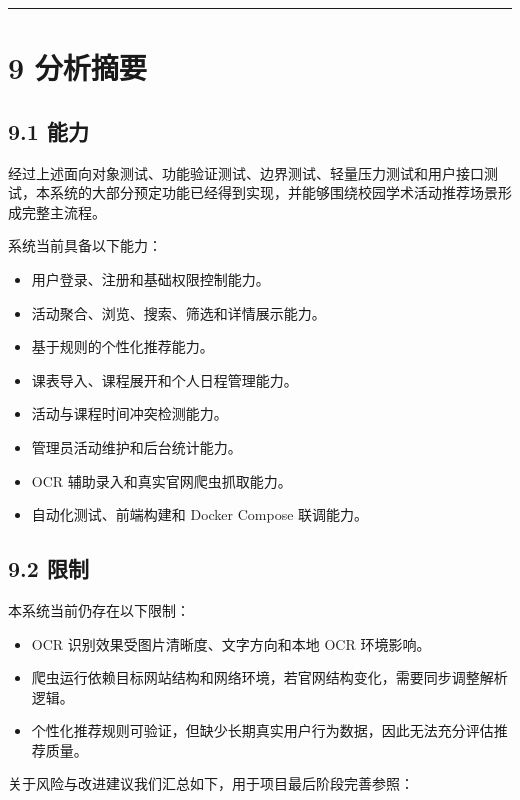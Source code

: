 \begin{center}\rule{0.5\linewidth}{0.5pt}\end{center}

\section{9 分析摘要}\label{ux5206ux6790ux6458ux8981}

\subsection{9.1 能力}\label{ux80fdux529b}

经过上述面向对象测试、功能验证测试、边界测试、轻量压力测试和用户接口测试，本系统的大部分预定功能已经得到实现，并能够围绕校园学术活动推荐场景形成完整主流程。

系统当前具备以下能力：

\begin{itemize}
\tightlist
\item
  用户登录、注册和基础权限控制能力。
\item
  活动聚合、浏览、搜索、筛选和详情展示能力。
\item
  基于规则的个性化推荐能力。
\item
  课表导入、课程展开和个人日程管理能力。
\item
  活动与课程时间冲突检测能力。
\item
  管理员活动维护和后台统计能力。
\item
  OCR 辅助录入和真实官网爬虫抓取能力。
\item
  自动化测试、前端构建和 Docker Compose 联调能力。
\end{itemize}

\subsection{9.2 限制}\label{ux9650ux5236}

本系统当前仍存在以下限制：

\begin{itemize}
\tightlist
\item
  OCR 识别效果受图片清晰度、文字方向和本地 OCR 环境影响。
\item
  爬虫运行依赖目标网站结构和网络环境，若官网结构变化，需要同步调整解析逻辑。
\item
  个性化推荐规则可验证，但缺少长期真实用户行为数据，因此无法充分评估推荐质量。
\end{itemize}

关于风险与改进建议我们汇总如下，用于项目最后阶段完善参照：

